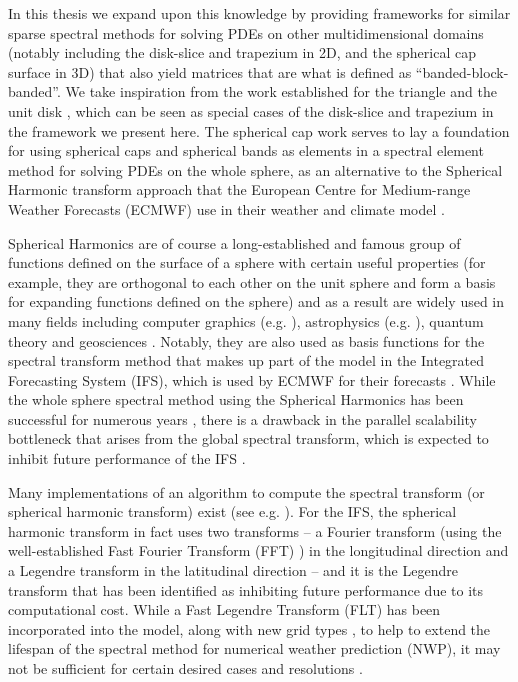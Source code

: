 In this thesis we expand upon this knowledge by providing frameworks for similar sparse spectral methods for solving PDEs on other multidimensional domains (notably including the disk-slice and trapezium in 2D, and the spherical cap surface in 3D) that also yield matrices that are what is defined as \enquote{banded-block-banded}. We take inspiration from the work established for the triangle \cite{olver2019triangle} and the unit disk \cite{vasil2016tensor}, which can  be seen as special cases of the disk-slice and trapezium in the framework we present here. The spherical cap work serves to lay a foundation for using spherical caps and spherical bands as elements in a spectral element method for solving PDEs on the whole sphere, as an alternative to the Spherical Harmonic transform approach that the European Centre for Medium-range Weather Forecasts (ECMWF) use in their weather and climate model \cite{cheong2006dynamical}. 

Spherical Harmonics are of course a long-established and famous group of functions defined on the surface of a sphere with certain useful properties (for example, they are orthogonal to each other on the unit sphere and form a basis for expanding functions defined on the sphere) and as a result are widely used in many fields including computer graphics (e.g. \cite{moon2008efficient, sloan2013efficient}), astrophysics (e.g. \cite{vasil2019tensor}), quantum theory \cite{varshalovich1988quantum} and geosciences . Notably, they are also used as basis functions for the spectral transform method that makes up part of the model in the Integrated Forecasting System (IFS), which is used by ECMWF for their forecasts \cite{wedi2013fast}. While the whole sphere spectral method using the Spherical Harmonics has been successful for numerous years \cite{williamson2007evolution}, there is a drawback in the parallel scalability bottleneck that arises from the global spectral transform, which is expected to inhibit future performance of the IFS \cite{ecmwf2020scalability, wedi2013fast, diamantakisecmwf}. 

Many implementations of an algorithm to compute the spectral transform (or spherical harmonic transform) exist (see e.g. \cite{slevinsky2019fast, suda2002fast}). For the IFS, the spherical harmonic transform in fact uses two transforms -- a Fourier transform (using the well-established Fast Fourier Transform (FFT) \cite{cooley1965algorithm}) in the longitudinal direction and a Legendre transform in the latitudinal direction -- and it is the Legendre transform that has been identified as inhibiting future performance due to its computational cost. While a Fast Legendre Transform (FLT) \cite{wedi2013fast} has been incorporated into the model, along with new grid types \cite{malardel2016new}, to help to extend the lifespan of the spectral method for numerical weather prediction (NWP), it may not be sufficient for certain desired cases and resolutions \cite{diamantakisecmwf}. 

